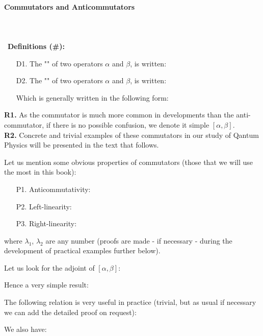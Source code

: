 	\paragraph{Commutators and Anticommutators}\mbox{}\\\\\
	\textbf{Definitions (\#\mydef):}
	\begin{itemize}
		\item[D1.] The "" of two operators $\alpha$ and $\beta$, is written:
		
		\item[D2.] The "" of two operators $\alpha$ and $\beta$, is written:
		
		Which is generally written in the following form:
		
	\end{itemize}
	\begin{tcolorbox}[title=Remarks,colframe=black,arc=10pt]
	\textbf{R1.} As the commutator is much more common in developments than the anti-commutator, if there is no possible confusion, we denote it simple $[\alpha,\beta]$.\\
	
	\textbf{R2.} Concrete and trivial examples of these commutators in our study of Qantum Physics will be presented in the text that follows.
	\end{tcolorbox}
	Let us mention some obvious properties of commutators (those that we will use the most in this book):
	\begin{enumerate}
		\item[P1.] Anticommutativity:
		

		\item[P2.] Left-linearity:
		

		\item[P3.] Right-linearity:
		
	\end{enumerate}
	where $\lambda_1$, $\lambda_2$ are any number (proofs are made - if necessary - during the development of practical examples further below).
	
	Let us look for the adjoint of $[\alpha,\beta]$:
	
	Hence a very simple result:
	
	The following relation is very useful in practice (trivial, but as usual if necessary we can add the detailed proof on request):
	
	We also have:
	
